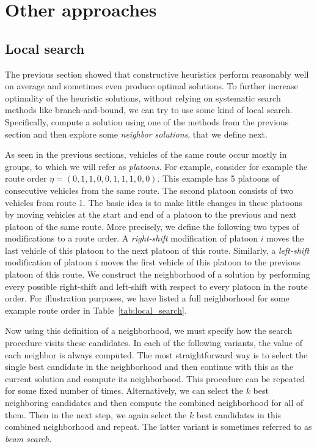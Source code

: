 \documentclass[a4paper]{article}
\theoremstyle{definition}
\theoremstyle{plain}
\begin{document}


\section{Other approaches}

\subsection{Local search}

The previous section showed that constructive heuristics perform reasonably well
on average and sometimes even produce optimal solutions. To further increase
optimality of the heuristic solutions, without relying on systematic search
methods like branch-and-bound, we can try to use some kind of local search.
Specifically, compute a solution using one of the methods from the previous
section and then explore some \textit{neighbor solutions}, that we define next.

As seen in the previous sections, vehicles of the same route occur mostly in
groups, to which we will refer as \textit{platoons}. For example, consider for example
the route order $\eta = (0, 1, 1, 0, 0, 1, 1, 1, 0, 0)$. This example has 5
platoons of consecutive vehicles from the same route. The second platoon
consists of two vehicles from route 1.
The basic idea is to make little changes in these platoons by moving vehicles at
the start and end of a platoon to the previous and next platoon of the same
route.
%
More precisely, we define the following two types of modifications to a route
order. A \textit{right-shift} modification of platoon $i$ moves the last vehicle of this
platoon to the next platoon of this route. Similarly, a \textit{left-shift} modification
of platoon $i$ moves the first vehicle of this platoon to the previous platoon
of this route.
%
We construct the neighborhood of a solution by performing every possible
right-shift and left-shift with respect to every platoon in the route order. For
illustration purposes, we have listed a full neighborhood for some example route
order in Table~\ref{tab:local_search}.

Now using this definition of a neighborhood, we must specify how the search
procedure visits these candidates.
In each of the following variants, the value of each neighbor is always computed.
%
The most straightforward way is to select the single best candidate in the
neighborhood and then continue with this as the current solution and compute its
neighborhood. This procedure can be repeated for some fixed number of times.
Alternatively, we can select the $k$ best neighboring candidates and then
compute the combined neighborhood for all of them. Then in the next step, we
again select the $k$ best candidates in this combined neighborhood and repeat.
The latter variant is sometimes referred to as \textit{beam search}.
\end{document}
